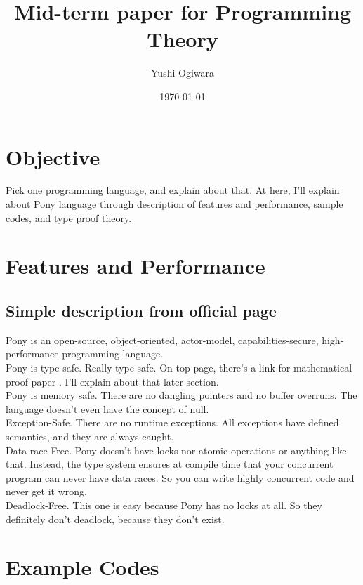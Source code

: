 \documentclass{article}
\title{Mid-term paper for Programming Theory}
\author{Yushi Ogiwara}
\date{\today}
\begin{document}
\maketitle

\section{Objective}
Pick one programming language, and explain about that.
At here, I'll explain about Pony language \cite{ponylang} through description of features and performance, sample codes, and type proof theory.


\section{Features and Performance}
\subsection{Simple description from official page \cite{ponylang}}
Pony is an open-source, object-oriented, actor-model, capabilities-secure, high-performance programming language. \\

Pony is type safe. Really type safe. On top page, there’s a link for mathematical proof paper \cite{type-proof-paper}. I’ll explain about that later section. \\

Pony is memory safe. There are no dangling pointers and no buffer overruns. The language doesn't even have the concept of null. \\

Exception-Safe. There are no runtime exceptions. All exceptions have defined semantics, and they are always caught. \\

Data-race Free. Pony doesn’t have locks nor atomic operations or anything like that. Instead, the type system ensures at compile time that your concurrent program can never have data races. So you can write highly concurrent code and never get it wrong. \\

Deadlock-Free. This one is easy because Pony has no locks at all. So they definitely don’t deadlock, because they don’t exist.



\section{Example Codes}
\end{document}
